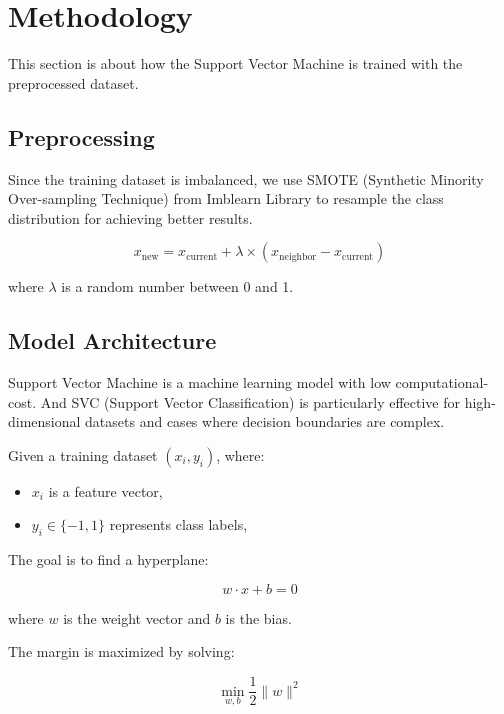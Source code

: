 \documentclass[a4paper,12pt]{article}
\begin{document}
\section{Methodology}
This section is about how the Support Vector Machine is trained with the preprocessed dataset.

\subsection{Preprocessing}
Since the training dataset is imbalanced, we use SMOTE (Synthetic Minority Over-sampling Technique) from Imblearn Library to resample the class distribution for achieving better results.

\begin{equation}
    x_{\text{new}} = x_{\text{current}} + \lambda \times (x_{\text{neighbor}} - x_{\text{current}})
\end{equation}

where \( \lambda \) is a random number between 0 and 1.

\subsection{Model Architecture}

Support Vector Machine is a machine learning model with low computational-cost. And SVC (Support Vector Classification) is particularly effective for high-dimensional datasets and cases where decision boundaries are complex.

\vspace{0.5cm}

Given a training dataset \( (x_i, y_i) \), where:

\begin{itemize}
    \item \( x_i \) is a feature vector,
    \item \( y_i \in \{-1,1\} \) represents class labels,
\end{itemize}

The goal is to find a hyperplane:

\begin{equation}
    w \cdot x + b = 0
\end{equation}

where \( w \) is the weight vector and \( b \) is the bias.

The margin is maximized by solving:

\begin{equation}
    \min_{w,b} \frac{1}{2} \|w\|^2
\end{equation}
\end{document}
